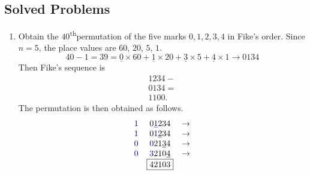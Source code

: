 \documentclass[svgnames]{article}
\renewcommand{\th}{\textsuperscript{th}}
\begin{document}
\subsection*{Solved Problems}
\begin{enumerate}
\item Obtain the $40$\th permutation of the five marks $0, 1, 2, 3, 4$ in Fike's order.
Since $n = 5$, the place values are $60$, $20$, $5$, $1$.
\begin{equation*}
40 - 1 = 39 = \underline 0 \times 60 + \underline 1 \times 20 + \underline 3 \times 5 + \underline 4 \times 1 \to 0134
\end{equation*}
Then Fike's sequence is
\begin{equation*}
\begin{array}{l}
1234 - {}\\
0134 = {}\\
\hline
1100.
\end{array}
\end{equation*}
The permutation is then obtained as follows.
\begin{equation*}
\begin{array}{rcr}
\textcolor{blue!50!black}{1} & 0 \textcolor{blue!50!black}{\underline 1}234 & \to\\
\textcolor{blue!50!black}{1} & 0 \textcolor{blue!50!black}{1}\underline 234 & \to\\
\textcolor{blue!50!black}{0} & \textcolor{blue!50!black}{0}21\underline 34 & \to \\
\textcolor{blue!50!black}{0} & \textcolor{blue!50!black}{3}210\underline 4 & \to \\
 & \boxed{42103} &
\end{array}
\end{equation*}


\end{enumerate}
\end{document}
